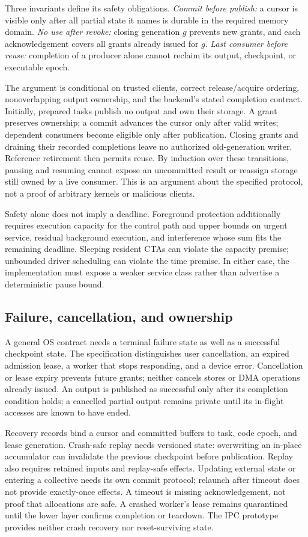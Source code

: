 Three invariants define its safety obligations. \emph{Commit before publish:}
a cursor is visible only after all partial state it names is durable in the
required memory domain. \emph{No use after revoke:} closing generation $g$
prevents new grants, and each acknowledgement covers all grants already
issued for $g$. \emph{Last consumer before reuse:} completion of a producer
alone cannot reclaim its output, checkpoint, or executable epoch.

The argument is conditional on trusted clients, correct release/acquire
ordering, nonoverlapping output ownership, and the backend's stated completion
contract. Initially, prepared tasks publish no output and own their storage.
A grant preserves ownership; a commit advances the cursor only after valid
writes; dependent consumers become eligible only after publication. Closing
grants and draining their recorded completions leave no authorized old-generation
writer. Reference retirement then permits reuse. By induction over these
transitions, pausing and resuming cannot expose an uncommitted result or
reassign storage still owned by a live consumer. This is an argument about
the specified protocol, not a proof of arbitrary kernels or malicious clients.

Safety alone does not imply a deadline. Foreground protection additionally
requires execution capacity for the control path and upper bounds on urgent
service, residual background execution, and interference whose sum fits the
remaining deadline. Sleeping resident CTAs can violate the capacity premise;
unbounded driver scheduling can violate the time premise. In either case,
the implementation must expose a weaker service class rather than advertise
a deterministic pause bound.

\subsection{Failure, cancellation, and ownership}
A general OS contract needs a terminal failure state as well as a successful
checkpoint state. The specification distinguishes user cancellation, an
expired admission lease, a worker that stops responding, and a device error.
Cancellation or lease expiry prevents future grants; neither cancels stores
or DMA operations already issued. An output is published as successful
only after its completion condition holds; a cancelled partial output remains
private until its in-flight accesses are known to have ended.

Recovery records bind a cursor and committed buffers to task, code epoch,
and lease generation. Crash-safe replay needs versioned state: overwriting an
in-place accumulator can invalidate the previous checkpoint before publication.
Replay also requires retained inputs and replay-safe effects. Updating external state or entering a
collective needs its own commit protocol; relaunch after timeout does not
provide exactly-once effects. A timeout is missing acknowledgement, not proof
that allocations are safe. A crashed worker's lease remains quarantined until
the lower layer confirms completion or teardown. The IPC prototype provides neither crash recovery nor reset-surviving state.

